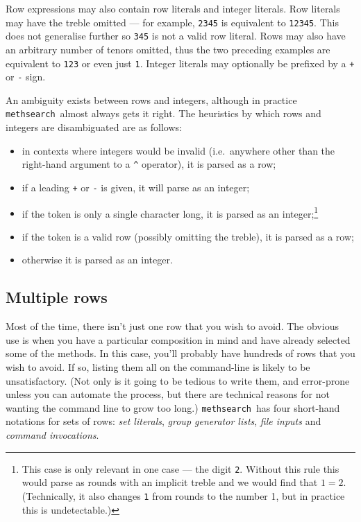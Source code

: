 \documentclass[a4paper,11pt,oneside]{book}
\def\methsearch{\texttt{meth\-search}}
\begin{document}
Row expressions may also contain row literals and integer literals.
Row literals may have the treble omitted --- for example,
\verb+2345+ is equivalent to \verb+12345+.  This does not generalise
further so \verb+345+ is not a valid row literal.  Rows may also have 
an arbitrary number of tenors omitted, thus the two preceding examples
are equivalent to \verb+123+ or even just \verb+1+.  
Integer literals may optionally be prefixed by a \verb-+- or \verb+-+ sign.

An ambiguity exists between rows and integers, although in practice
\methsearch\ almost always gets it right.  The heuristics by which rows
and integers are disambiguated are as follows:
\begin{itemize}\renewcommand{\labelitemi}{---}
\item in contexts where integers would be invalid (i.e.\ anywhere other
than the right-hand argument to a \verb+^+ operator), it is parsed as a row;
\item if a leading \verb-+- or \verb+-+ is given, it will parse as an integer;
\item if the token is only a single character long, it is parsed as an 
integer;\footnote{This case is only relevant in one case --- the digit 
\verb+2+.  Without this rule this would parse as rounds with an implicit 
treble and we would find that $1 = 2$.  (Technically, it also changes \verb+1+
from rounds to the number 1, but in practice this is undetectable.)}
\item if the token is a valid row (possibly omitting the treble), it is 
parsed as a row;
\item otherwise it is parsed as an integer.
\end{itemize}

\subsection{Multiple rows}\label{rowexprmulti}

Most of the time, there isn't just one row that you wish to avoid.
The obvious use is when you have a particular composition in mind and have
already selected some of the methods.  In this case, you'll probably have
hundreds of rows that you wish to avoid.
If so, listing them all on the command-line is likely to be unsatisfactory.
(Not only is it going to be tedious to write them, and error-prone unless
you can automate the process, but there are technical reasons for not
wanting the command line to grow too long.)
\methsearch\ has four short-hand notations for sets of rows: 
\textit{set literals}, \textit{group generator lists},
\textit{file inputs} and \textit{command invocations}.
\end{document}
